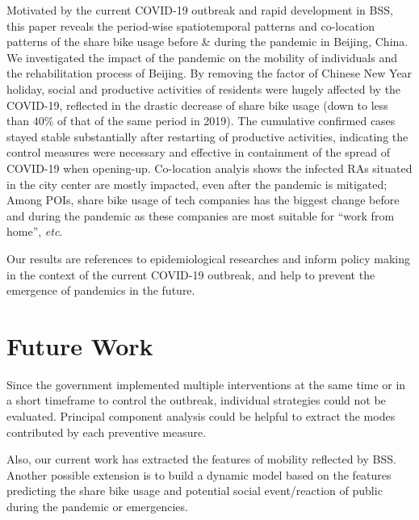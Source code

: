 \documentclass[preprints,ijgi,submit,moreauthors]{Definitions/mdpi}
\begin{document}
Motivated by the current COVID-19 outbreak and rapid development in BSS, this paper reveals the period-wise spatiotemporal patterns and co-location patterns of the share bike usage before \& during the pandemic in Beijing, China.
We investigated the impact of the pandemic on the mobility of individuals and the rehabilitation process of Beijing.
By removing the factor of Chinese New Year holiday, social and productive activities of residents were hugely affected by the COVID-19, reflected in the drastic decrease of share bike usage (down to less than $40\%$ of that of the same period in 2019). 
The cumulative confirmed cases stayed stable substantially after restarting of productive activities, indicating the control measures were necessary and effective in containment of the spread of COVID-19 when opening-up.
Co-location analyis shows the infected RAs situated in the city center are mostly impacted, even after the pandemic is mitigated;
Among POIs, share bike usage of tech companies has the biggest change before and during the pandemic as these companies are most suitable for ``work from home'', \textit{etc}.

Our results are references to epidemiological researches and inform policy making in the context of the current COVID-19 outbreak, and help to prevent the emergence of pandemics in the future.

\section{Future Work}

Since the government implemented multiple interventions at the same time or in a short timeframe to control the outbreak, individual strategies could not be evaluated.
Principal component analysis could be helpful to extract the modes contributed by each preventive measure.

Also, our current work has extracted the features of mobility reflected by BSS.
Another possible extension is to build a dynamic model based on the features predicting the share bike usage and potential social event/reaction of public during the pandemic or emergencies.


\end{document}
